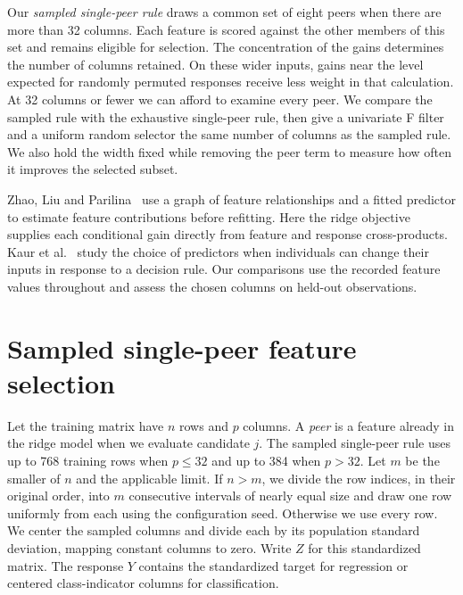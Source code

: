 \documentclass[11pt,a4paper]{article}
\begin{document}
Our \emph{sampled single-peer rule} draws a common set of eight peers when there are more than 32 columns. Each feature is scored against the other members of this set and remains eligible for selection. The concentration of the gains determines the number of columns retained. On these wider inputs, gains near the level expected for randomly permuted responses receive less weight in that calculation. At 32 columns or fewer we can afford to examine every peer. We compare the sampled rule with the exhaustive single-peer rule, then give a univariate F filter and a uniform random selector the same number of columns as the sampled rule. We also hold the width fixed while removing the peer term to measure how often it improves the selected subset.

Zhao, Liu and Parilina~\cite{zhao} use a graph of feature relationships and a fitted predictor to estimate feature contributions before refitting. Here the ridge objective supplies each conditional gain directly from feature and response cross-products. Kaur et al.~\cite{kaur} study the choice of predictors when individuals can change their inputs in response to a decision rule. Our comparisons use the recorded feature values throughout and assess the chosen columns on held-out observations.

\section{Sampled single-peer feature selection}\label{sec:method}
Let the training matrix have $n$ rows and $p$ columns. A \emph{peer} is a feature already in the ridge model when we evaluate candidate $j$. The sampled single-peer rule uses up to 768 training rows when $p\le32$ and up to 384 when $p>32$. Let $m$ be the smaller of $n$ and the applicable limit. If $n>m$, we divide the row indices, in their original order, into $m$ consecutive intervals of nearly equal size and draw one row uniformly from each using the configuration seed. Otherwise we use every row. We center the sampled columns and divide each by its population standard deviation, mapping constant columns to zero. Write $Z$ for this standardized matrix. The response $Y$ contains the standardized target for regression or centered class-indicator columns for classification.
\end{document}
